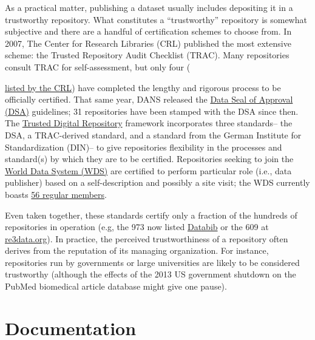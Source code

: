 \documentclass[10pt,a4paper,twocolumn]{article}
\begin{document}
As a practical matter, publishing a dataset usually includes depositing it in a trustworthy repository.
What constitutes a ``trustworthy'' repository is somewhat subjective and there are a handful of certification schemes to choose from.
In 2007, The Center for Research Libraries (CRL) published the most extensive scheme: the Trusted Repository Audit Checklist (TRAC)\cite{dale_trustworthy_2007}.
Many repositories consult TRAC for self-assessment, but only four ({\href{http://www.crl.edu/archiving-preservation/digital-archives/metrics-assessing-and-certifying-0}{listed by the CRL}) have completed the lengthy and rigorous process to be officially certified.
That same year, DANS released the \href{http://datasealofapproval.org/}{Data Seal of Approval (DSA)} guidelines; 31 repositories have been stamped with the DSA since then.
The \href{http://www.trusteddigitalrepository.eu/}{Trusted Digital Repository} framework incorporates three standards-- the DSA, a TRAC-derived standard, and a  standard from the German Institute for Standardization (DIN)-- to give repositories flexibility in the processes and standard(s) by which they are to be certified.
Repositories seeking to join the \href{https://www.icsu-wds.org/}{World Data System (WDS)} are certified to perform particular role (i.e., data publisher) based on a self-description and possibly a site visit; the WDS currently boasts \href{http://www.icsu-wds.org/community/membership/regular-members}{56 regular members}.

Even taken together, these standards certify only a fraction of the hundreds of repositories in operation (e.g, the 973 now listed \href{http://databib.org/}{Databib} or the 609 at \href{http://www.re3data.org/}{re3data.org}).
In practice, the perceived trustworthiness of a repository often derives from the reputation of its managing organization.
For instance, repositories run by governments or large universities are likely to be considered trustworthy (although the effects of the 2013 US government shutdown on the PubMed biomedical article database\cite{check_hayden_nih_2013} might give one pause).


\section*{Documentation}\label{documentation}

}
\end{document}
